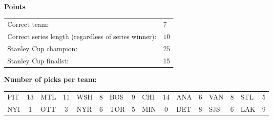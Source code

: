 \documentclass[10pt]{article}
\begin{document}
{\bf Points}\\
\begin{minipage}{12cm}
    \begin{tabular}{l l}
        Correct team:	& $7$\\
        Correct series length (regardless of series winner):	& $10$\\
        Stanley Cup champion:	& 25\\
        Stanley Cup finalist:	& 15\\
    \end{tabular}

    \vspace{1cm}
    {\bf Number of picks per team:}\\
    \begin{tabular}{lc | lc | lc | lc | lc | lc | lc | lc }
        PIT & 13 & MTL & 11 & WSH & 8 & BOS & 9 & CHI & 14 & ANA & 6 & VAN & 8 & STL & 5 \\
        NYI & 1 & OTT & 3 & NYR & 6 & TOR & 5 & MIN & 0 & DET & 8 & SJS & 6 & LAK & 9 \\
    \end{tabular}
\end{minipage}
\end{document}
